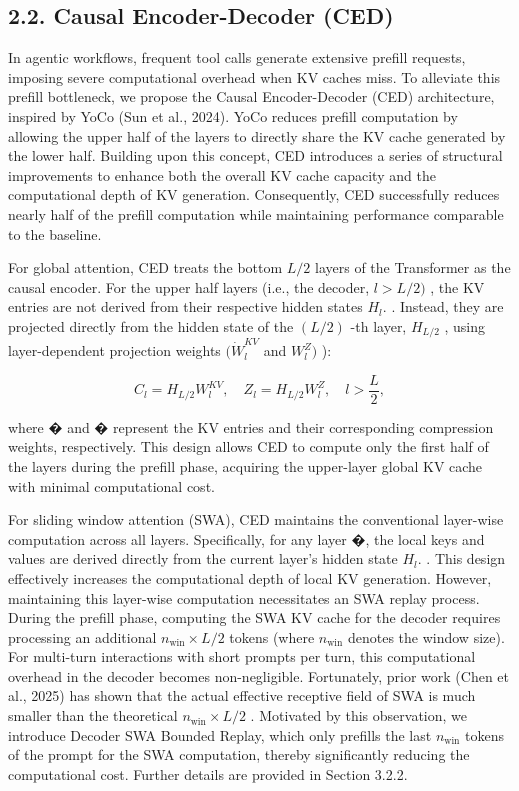 \documentclass[
  10
]{article}
\begin{document}
\subsection{2.2. Causal Encoder-Decoder
(CED)}\label{causal-encoder-decoder-ced}

In agentic workflows, frequent tool calls generate extensive prefill
requests, imposing severe computational overhead when KV caches miss. To
alleviate this prefill bottleneck, we propose the Causal Encoder-Decoder
(CED) architecture, inspired by YoCo (Sun et al., 2024). YoCo reduces
prefill computation by allowing the upper half of the layers to directly
share the KV cache generated by the lower half. Building upon this
concept, CED introduces a series of structural improvements to enhance
both the overall KV cache capacity and the computational depth of KV
generation. Consequently, CED successfully reduces nearly half of the
prefill computation while maintaining performance comparable to the
baseline.

For global attention, CED treats the bottom \(L / 2\) layers of the
Transformer as the causal encoder. For the upper half layers (i.e., the
decoder, \(l > L / 2 )\) , the KV entries are not derived from their
respective hidden states \(H _ { l } .\) . Instead, they are projected
directly from the hidden state of the \(( L / 2 )\) -th layer,
\(H _ { L / 2 }\) , using layer-dependent projection weights
\(( \dot { W } _ { l } ^ { K V }\) and \(W _ { l } ^ { Z } )\) ):

\[
C _ {l} = H _ {L / 2} W _ {l} ^ {K V}, \quad Z _ {l} = H _ {L / 2} W _ {l} ^ {Z}, \quad l > \frac {L}{2},\tag{1}
\]

where � and � represent the KV entries and their corresponding
compression weights, respectively. This design allows CED to compute
only the first half of the layers during the prefill phase, acquiring
the upper-layer global KV cache with minimal computational cost.

For sliding window attention (SWA), CED maintains the conventional
layer-wise computation across all layers. Specifically, for any layer �,
the local keys and values are derived directly from the current layer's
hidden state \(H _ { l } .\) . This design effectively increases the
computational depth of local KV generation. However, maintaining this
layer-wise computation necessitates an SWA replay process. During the
prefill phase, computing the SWA KV cache for the decoder requires
processing an additional \(n _ { \mathrm { w i n } } \times L / 2\)
tokens (where \(n _ { \mathrm { { w i n } } }\) denotes the window
size). For multi-turn interactions with short prompts per turn, this
computational overhead in the decoder becomes non-negligible.
Fortunately, prior work (Chen et al., 2025) has shown that the actual
effective receptive field of SWA is much smaller than the theoretical
\(n _ { \mathrm { w i n } } \times L / 2\) . Motivated by this
observation, we introduce Decoder SWA Bounded Replay, which only
prefills the last \(n _ { \mathrm { w i n } }\) tokens of the prompt for
the SWA computation, thereby significantly reducing the computational
cost. Further details are provided in Section 3.2.2.
\end{document}
